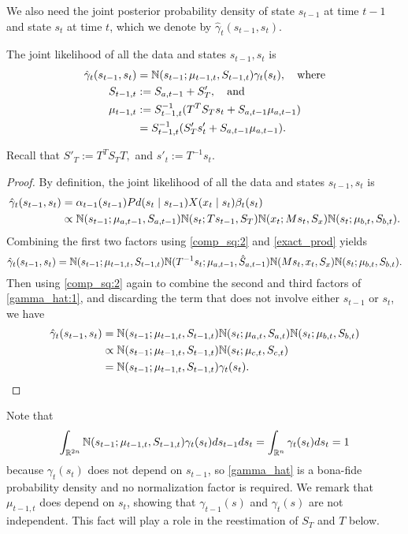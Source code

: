 \documentclass[12pt,leqno]{article}
\begin{document}
We also need the joint posterior probability density of state $s_{t-1}$ at time $t-1$ and state $s_t$ at time $t$,
which we denote by $\hat{\gamma}_t(s_{t-1},s_t)$.
\begin{Lem}\label{gamma_hat}
The joint likelihood of all the data and states $s_{t-1},s_t$ is
\begin{align*}
  \hat{\gamma}_t(s_{t-1},s_t) &= {\mathbb N}(s_{t-1};\mu_{t-1,t},S_{t-1,t})\gamma_t(s_t), \quad\text{where} \\
  S_{t-1,t} &:= S_{a,t-1}+S_T',\quad\text{and}\\
  \mu_{t-1,t} &:= S_{t-1,t}^{-1}(T^TS_Ts_t + S_{a,t-1}\mu_{a,t-1})\\
  &= S_{t-1,t}^{-1}(S'_Ts'_t + S_{a,t-1}\mu_{a,t-1}).\\
\end{align*}
\end{Lem}
Recall that $S'_T := T^TS_TT,$ and $s'_t := T^{-1}s_t$.
\begin{proof}
  By definition, the joint likelihood of all the data and states $s_{t-1},s_t$ is 
  \begin{align*}
    \hat{\gamma}_t(s_{t-1},s_t) &= \alpha_{t-1}(s_{t-1})Pd(s_t\mid s_{t-1})X(x_t\mid s_t)\beta_t(s_t) \\
    &\propto {\mathbb N}(s_{t-1};\mu_{a,t-1},S_{a,t-1}){\mathbb N}(s_t;Ts_{t-1},S_T){\mathbb N}(x_t;Ms_t,S_x){\mathbb N}(s_t;\mu_{b,t},S_{b,t}).
  \end{align*}
  Combining the first two factors using \eqref{comp_sq:2} and \eqref{exact_prod} yields
  \begin{equation}\label{gamma_hat:1}
    \hat{\gamma}_t(s_{t-1},s_t) = {\mathbb N}(s_{t-1};\mu_{t-1,t},S_{t-1,t}){\mathbb N}(T^{-1}s_t;\mu_{a,t-1},\hat{S}_{a,t-1}){\mathbb N}(Ms_t,x_t,S_x){\mathbb N}(s_t;\mu_{b,t},S_{b,t}).
  \end{equation}
  Then using \eqref{comp_sq:2} again to combine the second and third factors of \eqref{gamma_hat:1}, and discarding
  the term that does not involve either $s_{t-1}$ or $s_t$, we have
    \begin{align*}
      \hat{\gamma}_t(s_{t-1},s_t) &= {\mathbb N}(s_{t-1};\mu_{t-1,t},S_{t-1,t}){\mathbb N}(s_t;\mu_{a,t},S_{a,t}){\mathbb N}(s_t;\mu_{b,t},S_{b,t})\\
      &\propto {\mathbb N}(s_{t-1};\mu_{t-1,t},S_{t-1,t}){\mathbb N}(s_t;\mu_{c,t},S_{c,t})\\ 
      &= {\mathbb N}(s_{t-1};\mu_{t-1,t},S_{t-1,t})\gamma_t(s_t).
    \end{align*}
\end{proof}
  Note that
  $$
  \int_{{\mathbb R}^{2n}}{\mathbb N}(s_{t-1};\mu_{t-1,t},S_{t-1,t})\gamma_t(s_t)ds_{t-1}ds_t = \int_{{\mathbb R}^n}\gamma_t(s_t)ds_t = 1 
  $$
  because $\gamma_t(s_t)$ does not depend on $s_{t-1}$, so \eqref{gamma_hat} is a bona-fide probability density and no
  normalization factor is required.  We remark that $\mu_{t-1,t}$ does depend on $s_t$, showing that $\gamma_{t-1}(s)$
  and $\gamma_t(s)$ are not independent.  This fact will play a role in the reestimation of $S_T$ and $T$ below.
  
\end{document}
